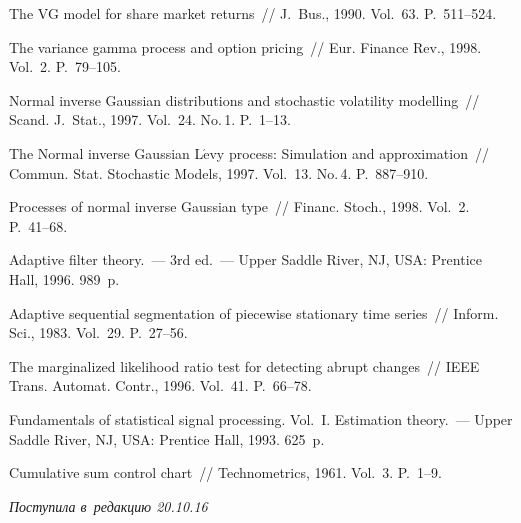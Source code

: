 \begin{multicols}{2}
{{\begin{thebibliography}{99}
     The VG model for share market returns~// 
    J.~Bus., 1990. Vol.~63. P.~511--524.

 The variance gamma 
process and option pricing~// Eur. Finance Rev., 1998. Vol.~2. P.~79--105.

  Normal inverse Gaussian distributions and 
stochastic volatility modelling~// Scand. J.~Stat., 1997. Vol.~24. No.\,1. P.~1--13.
    
   
    
 The Normal inverse Gaussian L$\acute{\mbox{e}}$vy process: Simulation 
and approximation~// Commun. Stat. Stochastic Models, 1997. 
Vol.~13. No.\,4. P.~887--910.

    Processes of normal inverse Gaussian type~// 
Financ. Stoch., 1998. Vol.~2. P.~41--68.

     Adaptive filter theory.~--- 3rd ed.~--- Upper Saddle River, NJ, USA: 
Prentice Hall, 1996. 989~p.

 Adaptive sequential segmentation of 
piecewise stationary time series~// Inform. Sci., 1983. Vol.~29. P.~27--56.

 The marginalized likelihood ratio test for detecting 
abrupt changes~// IEEE Trans. Automat. Contr., 1996. Vol.~41. P.~66--78.
    
     Fundamentals of statistical signal processing. Vol.~I. 
Estimation theory.~--- Upper Saddle River, NJ, USA: Prentice Hall, 1993. 625~p.

    Cumulative sum control chart~// Technometrics, 1961. 
Vol.~3. P.~1--9.
 \end{thebibliography}

 }
 }

\end{multicols}

\vspace*{-6pt}

\hfill{\small\textit{Поступила в~редакцию 20.10.16}}

\vspace*{8pt}



